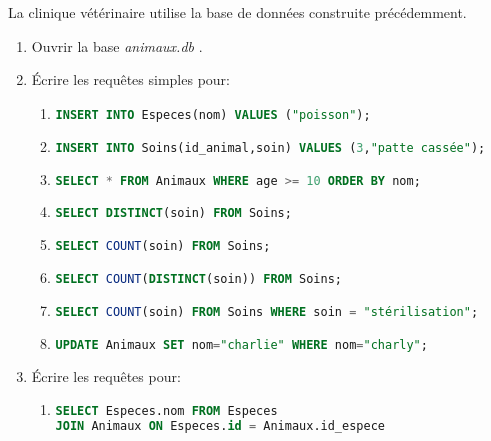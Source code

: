 \documentclass[a4paper,11pt]{article}
\begin{document}
\begin{Form}
\begin{exo}
La clinique vétérinaire utilise la base de données construite précédemment.
\begin{enumerate}
\item Ouvrir la base \emph{animaux.db} .
\item Écrire les requêtes simples pour:
\begin{enumerate}
\item \begin{lstlisting}[language=SQL]
INSERT INTO Especes(nom) VALUES ("poisson");
\end{lstlisting}
\item \begin{lstlisting}[language=SQL]
INSERT INTO Soins(id_animal,soin) VALUES (3,"patte cassée");
\end{lstlisting}
\item \begin{lstlisting}[language=SQL]
SELECT * FROM Animaux WHERE age >= 10 ORDER BY nom;
\end{lstlisting}
\item 
\begin{lstlisting}[language=SQL]
SELECT DISTINCT(soin) FROM Soins;
\end{lstlisting}
\item 
\begin{lstlisting}[language=SQL]
SELECT COUNT(soin) FROM Soins;
\end{lstlisting}
\item 
\begin{lstlisting}[language=SQL]
SELECT COUNT(DISTINCT(soin)) FROM Soins;
\end{lstlisting}
\item 
\begin{lstlisting}[language=SQL]
SELECT COUNT(soin) FROM Soins WHERE soin = "stérilisation";
\end{lstlisting}
\item 
\begin{lstlisting}[language=SQL]
UPDATE Animaux SET nom="charlie" WHERE nom="charly";
\end{lstlisting}
\end{enumerate}
\item Écrire les requêtes pour:
\begin{enumerate}
\item 
\begin{lstlisting}[language=SQL]
SELECT Especes.nom FROM Especes
JOIN Animaux ON Especes.id = Animaux.id_espece

\end{lstlisting}
\end{enumerate}
\end{enumerate}
\end{exo}
\end{Form}
\end{document}
